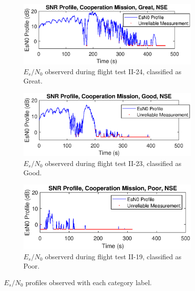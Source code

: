 \begin{figure}[ht!]
\centering
\begin{subfigure}{\linewidth}
\centering
\includegraphics{figures/flight_results/coop_great_nse_esno.eps}
\caption{$E_s/N_0$ observerd during flight test II-24, classified as Great.}
\end{subfigure}
\begin{subfigure}{\linewidth}
\centering
\includegraphics{figures/flight_results/coop_good_nse_esno.eps}
\caption{$E_s/N_0$ observerd during flight test II-23, classified as Good.}
\end{subfigure}
\begin{subfigure}{\linewidth}
\centering
\includegraphics{figures/flight_results/coop_poor_nse_esno.eps}
\caption{$E_s/N_0$ observerd during flight test II-19, classified as Poor.}
\end{subfigure}

\caption{$E_s/N_0$ profiles observed with each category label.} \label{fig:snrProfileVarieties_flight}
\end{figure} 


